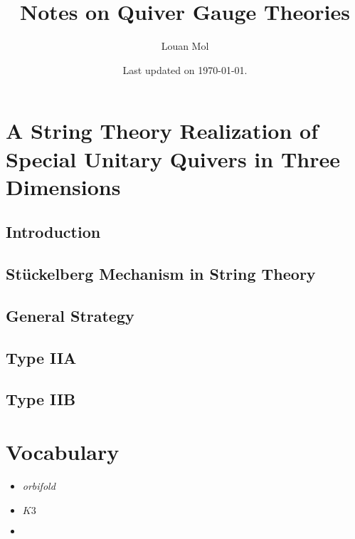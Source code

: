 \documentclass[a4paper,11pt]{article}
\title{Notes on Quiver Gauge Theories}
\author{Louan Mol}
\date{Last updated on \today.}
\begin{document}
\maketitle

\tableofcontents
  
\pagebreak


\section{A String Theory Realization of Special Unitary Quivers in Three Dimensions}

    \subsection{Introduction}

    \subsection{Stückelberg Mechanism in String Theory}

    \subsection{General Strategy}

    \subsection{Type IIA}

    \subsection{Type IIB}

\pagebreak
\appendix

\section{Vocabulary}

\begin{itemize}
    \item \emph{orbifold}
    \item \emph{$K3$}
    \item 
\end{itemize}
\end{document}
